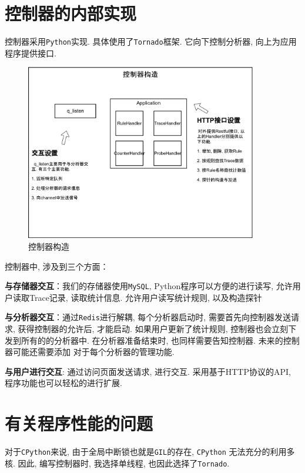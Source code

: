 \section{控制器的内部实现}

控制器采用\texttt{Python}实现. 具体使用了\texttt{Tornado}框架.
它向下控制分析器, 向上为应用程序提供接口.

\begin{figure}[htbp!]
  \centering
  \includegraphics[width=0.9\textwidth]{../img/controller_arch.png}
  \caption{控制器构造}
  \label{fig:contoler_arch}
\end{figure}

控制器中, 涉及到三个方面：

\textbf{与存储器交互}：我们的存储器使用\texttt{MySQL},
Python程序可以方便的进行读写, 允许用户读取Trace记录, 读取统计信息.
允许用户读写统计规则, 以及构造探针

\textbf{与分析器交互}：通过\texttt{Redis}\cite{redis}进行解耦, 每个分析器启动时,
需要首先向控制器发送请求, 获得控制器的允许后, 才能启动.
如果用户更新了统计规则, 控制器也会立刻下发到所有的的分析器中.
在分析器准备结束时, 也同样需要告知控制器. 未来的控制器可能还需要添加
对于每个分析器的管理功能.

\textbf{与用户进行交互}: 通过访问页面发送请求, 进行交互. 采用基于HTTP协议的API,
程序功能也可以轻松的进行扩展.


\section{有关程序性能的问题}

  对于\texttt{CPython}来说, 由于全局中断锁也就是\texttt{GIL}的存在, \texttt{CPython}
无法充分的利用多核. 因此, 编写控制器时, 我选择单线程, 也因此选择了\texttt{Tornado}.

